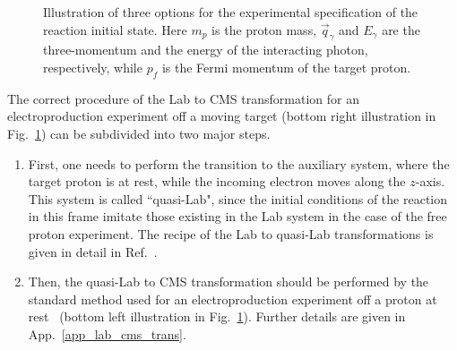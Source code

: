  
\begin{figure}[!ht]
\begin{center}
\end{center}
\caption{\small  Illustration of three options for the experimental specification of the reaction initial state. Here $m_{p}$ is the proton mass, $\vec q_{\gamma}$ and $E_{\gamma}$ are the three-momentum and the energy of the interacting photon, respectively, while $p_{f}$ is the Fermi momentum of the target proton.}
\label{fig:lab_to_CMS}
\end{figure}


The correct procedure of the Lab to CMS transformation for an electroproduction experiment off a moving target (bottom right illustration in Fig.~\ref{fig:lab_to_CMS}) can be subdivided into two major steps.

\begin{enumerate}
\item First, one needs to perform the transition to the auxiliary system, where the target proton is at rest, while the incoming electron moves along the $z$-axis. This system is called ``quasi-Lab", since the initial conditions of the reaction in this frame imitate those existing in the Lab system in the case of the free proton experiment. The recipe of the Lab to quasi-Lab transformations is given in detail in Ref.~\cite{twopeg-d}.

\item Then, the quasi-Lab to CMS transformation should be performed by the standard method used for an electroproduction experiment off a proton at rest~\cite{Fed_an_note:2017} (bottom left illustration in Fig.~\ref{fig:lab_to_CMS}). Further details are given in App.~\ref{app_lab_cms_trans}.
\end{enumerate}


